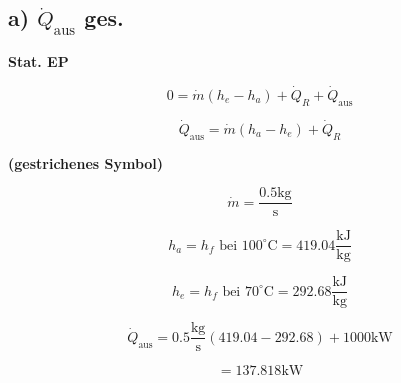 \subsection*{a) $\dot{Q}_{\text{aus}}$ ges.}

\textbf{Stat. EP}

\[
0 = \dot{m} (h_e - h_a) + \dot{Q}_R + \dot{Q}_{\text{aus}}
\]

\[
\dot{Q}_{\text{aus}} = \dot{m} (h_a - h_e) + \dot{Q}_R
\]

\textbf{(gestrichenes Symbol)}

\[
\dot{m} = \frac{0.5 \text{kg}}{\text{s}}
\]

\[
h_a = h_f \text{ bei } 100^\circ \text{C} = 419.04 \frac{\text{kJ}}{\text{kg}}
\]

\[
h_e = h_f \text{ bei } 70^\circ \text{C} = 292.68 \frac{\text{kJ}}{\text{kg}}
\]

\[
\dot{Q}_{\text{aus}} = 0.5 \frac{\text{kg}}{\text{s}} (419.04 - 292.68) + 1000 \text{kW}
\]

\[
= 137.818 \text{kW}
\]
